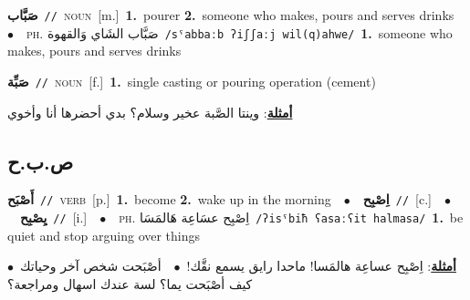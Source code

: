 \documentclass[10pt,a4paper,twoside]{article} %
\begin{document}
\begin{multicols}{2}
{\setlength\topsep{0pt}\textbf{\foreignlanguage{arabic}{صَبَّاب}}\ {\color{gray}\texttt{//}\color{black}}\ \textsc{noun}\ [m.]\ \textbf{1.}~pourer  \textbf{2.}~someone who makes, pours and serves drinks\ \ $\bullet$\ \ \textsc{ph.} \color{gray} \foreignlanguage{arabic}{صَبَّاب الشَاي وَالقهوة}\color{black}\ {\color{gray}\texttt{/{\sffamily sˤabbaːb ʔiʃʃaːj wil(q)ahwe}/}\color{black}}\ \textbf{1.}~someone who makes, pours and serves drinks\ } \vspace{2mm}

{\setlength\topsep{0pt}\textbf{\foreignlanguage{arabic}{صَبِّة}}\ {\color{gray}\texttt{//}\color{black}}\ \textsc{noun}\ [f.]\ \textbf{1.}~single casting or pouring operation (cement)\  \begin{flushright}\color{gray}\foreignlanguage{arabic}{\textbf{\underline{\foreignlanguage{arabic}{أمثلة}}}: وينتا الصَّبة عخير وسلام؟ بدي أحضرها أنا وأخوي}\end{flushright}\color{black}} \vspace{2mm}

\vspace{-3mm}
\subsection*{\color{blue}\foreignlanguage{arabic}{ص.ب.ح}\color{blue}{}} 

{\setlength\topsep{0pt}\textbf{\foreignlanguage{arabic}{أَصْبَح}}\ {\color{gray}\texttt{//}\color{black}}\ \textsc{verb}\ [p.]\ \textbf{1.}~become  \textbf{2.}~wake up in the morning\ \ $\bullet$\ \ \setlength\topsep{0pt}\textbf{\foreignlanguage{arabic}{اِصْبِح}}\ {\color{gray}\texttt{//}\color{black}}\ [c.]\ \ $\bullet$\ \ \setlength\topsep{0pt}\textbf{\foreignlanguage{arabic}{يِصْبِح}}\ {\color{gray}\texttt{//}\color{black}}\ [i.]\ \ $\bullet$\ \ \textsc{ph.} \color{gray} \foreignlanguage{arabic}{اِصْبِح عسَاعِة هَالمَسَا}\color{black}\ {\color{gray}\texttt{/{\sffamily ʔisˤbiħ ʕasaːʕit halmasa}/}\color{black}}\ \textbf{1.}~be quiet and stop arguing over things\  \begin{flushright}\color{gray}\foreignlanguage{arabic}{\textbf{\underline{\foreignlanguage{arabic}{أمثلة}}}: اِصْبِح عساعِة هالمَسا! ماحدا رايق يسمع نقَّك!\ $\bullet$\ \  أصْبَحت شخص آخر وحياتك\ $\bullet$\ \  كيف أصْبَحت يما؟ لسة عندك اسهال ومراجعة؟}\end{flushright}\color{black}} \vspace{2mm}


\end{multicols}
\end{document}
